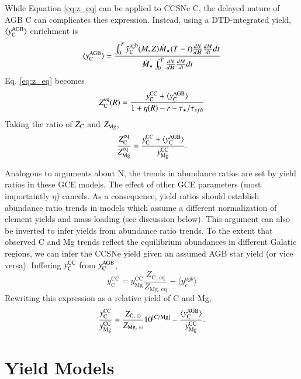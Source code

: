 \documentclass[12pt,oneside]{report}
\newcommand{\Ycc}{\ensuremath{y_{\rm C}^{\rm CC}}}
\newcommand{\Yoc}{\ensuremath{y_{\rm Mg}^{\rm CC}}}
\newcommand{\Ycagb}{\ensuremath{y_{\rm C}^{\rm AGB}}}
\begin{document}
While Equation \ref{eq:z_eq} can be applied to CCSNe C, the delayed nature of AGB C can complicates thes expression. Instead, using a DTD-integrated yield, $\langle \Ycagb \rangle$ enrichment is
\begin{equation}
    \langle \Ycagb\rangle = \frac{\int_0^T \tilde{y}_{\rm C}^{\rm agb}(M, Z) \dot{M}_\star(T - t) \frac{dN}{dM} \frac{dM}{dt} dt  }{ \dot{M}_\star \int_0^T \frac{dN}{dM} \frac{dM}{dt} dt}
\end{equation}
Eq. \ref{eq:z_eq} becomes
\begin{equation}
    Z_{\rm C}^{\rm eq}(R) = \frac{\Ycc + \langle\Ycagb\rangle}{1 + \eta(R) - r - \tau_\star / \tau_{sfh}}
\end{equation}
Taking the ratio of $Z_{\rm C}$ and $Z_{\rm Mg}$, 
\begin{equation}\label{eq:z_co}
    \frac{Z_{\rm C}^{\rm eq}}{Z_{\rm Mg}^{\rm eq}} = \frac{\Ycc + \langle \Ycagb \rangle }{\Yoc}.
\end{equation}

Analogous to \cite{james+23} arguments about N, the trends in abundance ratios are set by yield ratios in these GCE models. The effect of other GCE parameters (most importaintly $\eta$) cancels. As a consequence, yield ratios should establish abundance ratio trends in models which assume a different normalization of element yields and mass-loading (see discussion below).
This argument can also be inverted to infer  yields from abundance ratio trends. To the extent that observed C and Mg trends reflect the equilibrium abundances in different Galatic regions, we can infer the CCSNe yield given an assumed AGB star yield (or vice versa). Inffering $\Ycc$ from $\Ycagb$, 
\begin{equation}
    y_\text{C}^\text{CC} =  y_\text{Mg}^\text{CC} \frac{Z_\text{C,~eq}}{Z_\text{Mg,~eq}} - \langle y_c^{agb} \rangle
\end{equation}
Rewriting this expression as a relative yield of C and Mg,
\begin{equation}\label{eq:y_c_eq}
    \frac{\Ycc}{\Yoc} = \frac{Z_{\text{C},~\odot}}{Z_{\text{Mg},~\odot}} 10^{\rm [C/Mg]} - \frac{\langle \Ycagb \rangle}{\Yoc}.
\end{equation}

\section{Yield Models}
\end{document}
